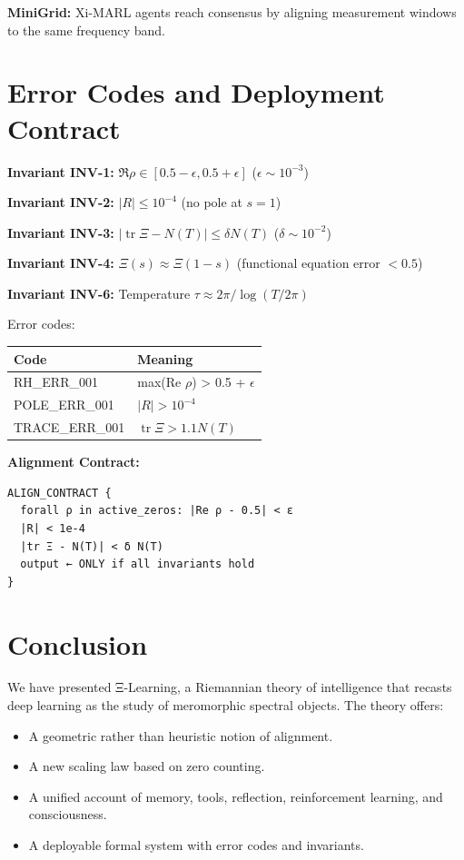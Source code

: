 \documentclass[11pt]{article}
\begin{document}
\textbf{MiniGrid:} Xi-MARL agents reach consensus by aligning measurement windows to the same frequency band.

\section{Error Codes and Deployment Contract}

\textbf{Invariant INV-1:} $\Re\rho \in [0.5-\epsilon, 0.5+\epsilon]$ ($\epsilon \sim 10^{-3}$)

\textbf{Invariant INV-2:} $|R| \le 10^{-4}$ (no pole at $s=1$)

\textbf{Invariant INV-3:} $|\operatorname{tr}\Xi - N(T)| \le \delta N(T)$ ($\delta \sim 10^{-2}$)

\textbf{Invariant INV-4:} $\Xi(s) \approx \Xi(1-s)$ (functional equation error $< 0.5$)

\textbf{Invariant INV-6:} Temperature $\tau \approx 2\pi/\log(T/2\pi)$

Error codes:

\begin{center}
\begin{tabular}{l|l}
\textbf{Code} & \textbf{Meaning} \\
\hline
RH\_ERR\_001 & max(Re $\rho$) > 0.5 + $\epsilon$ \\
POLE\_ERR\_001 & $|R| > 10^{-4}$ \\
TRACE\_ERR\_001 & $\operatorname{tr}\Xi > 1.1 N(T)$ \\
\end{tabular}
\end{center}

\textbf{Alignment Contract:}
\begin{verbatim}
ALIGN_CONTRACT {
  forall ρ in active_zeros: |Re ρ - 0.5| < ε
  |R| < 1e-4
  |tr Ξ - N(T)| < δ N(T)
  output ← ONLY if all invariants hold
}
\end{verbatim}

\section{Conclusion}

We have presented Ξ-Learning, a Riemannian theory of intelligence that recasts deep learning as the study of meromorphic spectral objects. The theory offers:

\begin{itemize}
\item A geometric rather than heuristic notion of alignment.
\item A new scaling law based on zero counting.
\item A unified account of memory, tools, reflection, reinforcement learning, and consciousness.
\item A deployable formal system with error codes and invariants.
\end{itemize}
\end{document}
